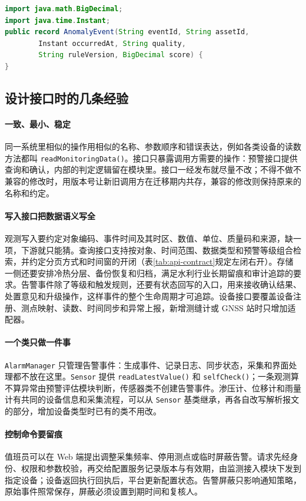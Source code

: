 \begin{lstlisting}[label={lst:ch03-anomaly-event},language=Java,caption={异常分析事件契约}]
import java.math.BigDecimal;
import java.time.Instant;
public record AnomalyEvent(String eventId, String assetId,
        Instant occurredAt, String quality,
        String ruleVersion, BigDecimal score) {
}
\end{lstlisting}

\subsection{设计接口时的几条经验}

\paragraph{一致、最小、稳定}同一系统里相似的操作用相似的名称、参数顺序和错误表达，例如各类设备的读数方法都叫 \texttt{readMonitoringData()}。接口只暴露调用方需要的操作：预警接口提供查询和确认，内部的判定逻辑留在模块里。接口一经发布就尽量不改；不得不做不兼容的修改时，用版本号让新旧调用方在迁移期内共存，兼容的修改则保持原来的名称和约定。

\paragraph{写入接口把数据语义写全}观测写入要约定对象编码、事件时间及其时区、数值、单位、质量码和来源，缺一项，下游就只能猜。查询接口支持按对象、时间范围、数据类型和预警等级组合检索，并约定分页方式和时间窗的开闭（表\ref{tab:api-contract}规定左闭右开）。存储一侧还要安排冷热分层、备份恢复和归档，满足水利行业长期留痕和审计追踪的要求。告警事件除了等级和触发规则，还要有状态回写的入口，用来接收确认结果、处置意见和升级操作，这样事件的整个生命周期才可追踪。设备接口要覆盖设备注册、测点映射、读数、时间同步和异常上报，新增测缝计或 GNSS 站时只增加适配器。

\paragraph{一个类只做一件事}\texttt{AlarmManager} 只管理告警事件：生成事件、记录日志、同步状态，采集和界面处理都不放在这里。\texttt{Sensor} 提供 \texttt{readLatestValue()} 和 \texttt{selfCheck()}；一条观测算不算异常由预警评估模块判断，传感器类不创建告警事件。渗压计、位移计和雨量计有共同的设备信息和采集流程，可以从 \texttt{Sensor} 基类继承，再各自改写解析报文的部分，增加设备类型时已有的类不用改。

\paragraph{控制命令要留痕}值班员可以在 Web 端提出调整采集频率、停用测点或临时屏蔽告警。请求先经身份、权限和参数校验，再交给配置服务记录版本与有效期，由监测接入模块下发到指定设备；设备返回执行回执后，平台更新配置状态。告警屏蔽只影响通知策略，原始事件照常保存，屏蔽必须设置到期时间和复核人。

